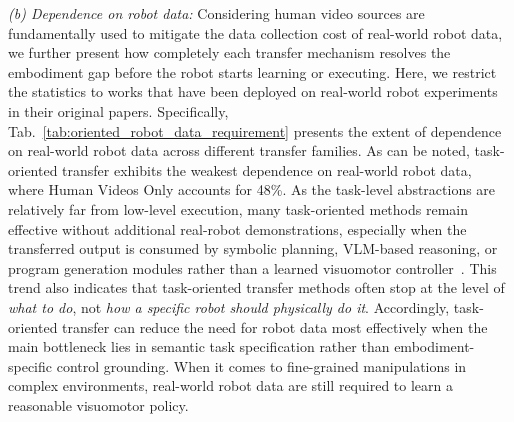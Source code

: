\documentclass[Afour,sageh,times]{sagej}
\begin{document}
\textit{(b) Dependence on robot data:} 
Considering human video sources are fundamentally used to mitigate the data collection cost of real-world robot data, we further present how completely each transfer mechanism resolves the embodiment gap before the robot starts learning or executing. Here, we restrict the statistics to works that have been deployed on real-world robot experiments in their original papers. Specifically, Tab.~\ref{tab:oriented_robot_data_requirement} presents the extent of dependence on real-world robot data across different transfer families. As can be noted, task-oriented transfer exhibits the weakest dependence on real-world robot data, where Human Videos Only accounts for 48\%. As the task-level abstractions are relatively far from low-level execution, many task-oriented methods remain effective without additional real-robot demonstrations, especially when the transferred output is consumed by symbolic planning, VLM-based reasoning, or program generation modules rather than a learned visuomotor controller~\citep{ding2024knowledge,chen2024vlmimic,chen2025fmimic,wake2024gpt,wang2024vlm,ye2025watch}. This trend also indicates that task-oriented transfer methods often stop at the level of \emph{what to do}, not \emph{how a specific robot should physically do it}. Accordingly, task-oriented transfer can reduce the need for robot data most effectively when the main bottleneck lies in semantic task specification rather than embodiment-specific control grounding. When it comes to fine-grained manipulations in complex environments, real-world robot data are still required to learn a reasonable visuomotor policy.
\end{document}
